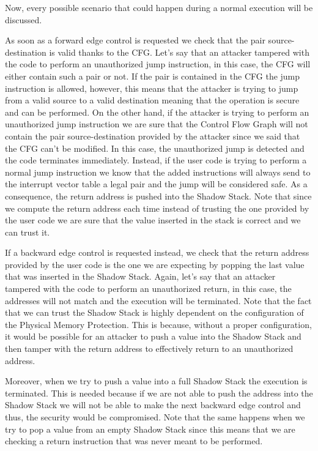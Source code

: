 Now, every possible scenario that could happen during a normal execution will be
discussed.

As soon as a forward edge control is requested we check that the pair source-destination
is valid thanks to the CFG. Let's say that an attacker tampered with the code to
perform an unauthorized jump instruction, in this case, the CFG will either contain
such a pair or not. If the pair is contained in the CFG the jump instruction is
allowed, however, this means that the attacker is trying to jump from a valid
source to a valid destination meaning that the operation is secure and can be
performed. On the other hand, if the attacker is trying to perform an
unauthorized jump instruction we are sure that the Control Flow Graph will not
contain the pair source-destination provided by the attacker since we said that
the CFG can't be modified. In this case, the unauthorized jump is detected and
the code terminates immediately. Instead, if the user code is trying to perform
a normal jump instruction we know that the added instructions will always send
to the interrupt vector table a legal pair and the jump will be considered safe.
As a consequence, the return address is pushed into the Shadow Stack. Note that since
we compute the return address each time instead of trusting the one provided by the
user code we are sure that the value inserted in the stack is correct and we can
trust it.

If a backward edge control is requested instead, we check that the return
address provided by the user code is the one we are expecting by popping the
last value that was inserted in the Shadow Stack. Again, let's say that an
attacker tampered with the code to perform an unauthorized return, in this case,
the addresses will not match and the execution will be terminated. Note that the
fact that we can trust the Shadow Stack is highly dependent on the configuration
of the Physical Memory Protection. This is because, without a proper configuration,
it would be possible for an attacker to push a value into the Shadow Stack and
then tamper with the return address to effectively return to an unauthorized
address.

Moreover, when we try to push a value into a full Shadow Stack the execution is terminated.
This is needed because if we are not able to push the address into the Shadow
Stack we will not be able to make the next backward edge control and thus, the security
would be compromised. Note that the same happens when we try to pop a value from
an empty Shadow Stack since this means that we are checking a return instruction
that was never meant to be performed.

